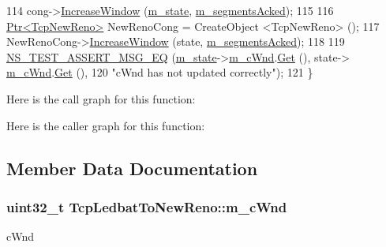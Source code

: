 \begin{DoxyCode}
114   cong->\hyperlink{classns3_1_1TcpLedbat_a9baf3c7c8d5572c3cf7c4249a2833748}{IncreaseWindow} (\hyperlink{classTcpLedbatToNewReno_a9f1cc821153a10a6bc9ef45aeabc59ed}{m\_state}, \hyperlink{classTcpLedbatToNewReno_a620920fd8c45cf139ec4ee3311ae71e2}{m\_segmentsAcked});
115 
116   \hyperlink{classns3_1_1Ptr}{Ptr<TcpNewReno>} NewRenoCong = CreateObject <TcpNewReno> ();
117   NewRenoCong->\hyperlink{classns3_1_1TcpNewReno_a11db8ae90f4cebacc15524a793b0741a}{IncreaseWindow} (state, \hyperlink{classTcpLedbatToNewReno_a620920fd8c45cf139ec4ee3311ae71e2}{m\_segmentsAcked});
118 
119   \hyperlink{group__testing_ga2a9d78cffb3db8e867c35fff0b698cf5}{NS\_TEST\_ASSERT\_MSG\_EQ} (\hyperlink{classTcpLedbatToNewReno_a9f1cc821153a10a6bc9ef45aeabc59ed}{m\_state}->\hyperlink{classns3_1_1TcpSocketState_a7cd3d2156a483c1db436097477a0fd7f}{m\_cWnd}.\hyperlink{classns3_1_1TracedValue_a10fddd1de961ac65acfbeb440a1e8551}{Get} (), state->
      \hyperlink{classns3_1_1TcpSocketState_a7cd3d2156a483c1db436097477a0fd7f}{m\_cWnd}.\hyperlink{classns3_1_1TracedValue_a10fddd1de961ac65acfbeb440a1e8551}{Get} (),
120                          \textcolor{stringliteral}{"cWnd has not updated correctly"});
121 \}
\end{DoxyCode}


Here is the call graph for this function\+:




Here is the caller graph for this function\+:




\subsection{Member Data Documentation}
\subsubsection[{\texorpdfstring{m\+\_\+c\+Wnd}{m_cWnd}}]{\setlength{\rightskip}{0pt plus 5cm}uint32\+\_\+t Tcp\+Ledbat\+To\+New\+Reno\+::m\+\_\+c\+Wnd\hspace{0.3cm}{\ttfamily [private]}}\hypertarget{classTcpLedbatToNewReno_ad911a6377af3597b75d2b30e563b41bf}{}\label{classTcpLedbatToNewReno_ad911a6377af3597b75d2b30e563b41bf}


c\+Wnd 

